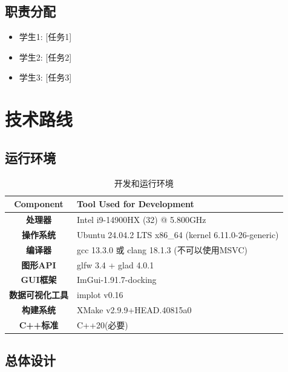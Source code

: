 \documentclass{article}
\begin{document}
\subsection{ 职责分配}
\begin{itemize}[leftmargin=*]
    \item 学生1: [任务1]
    \item 学生2: [任务2]
    \item 学生3: [任务3]
\end{itemize}

\section{技术路线}
\subsection{运行环境}
\begin{table}[H]
    \centering
    \caption{开发和运行环境}
    \begin{tabular}{@{}>{\bfseries}c>{\raggedright\arraybackslash}p{10cm}@{}} %
        \toprule
        \textbf{Component} & \textbf{Tool Used for Development}                    \\
        \midrule
        处理器                & Intel i9-14900HX (32) @ 5.800GHz                      \\
        操作系统               & Ubuntu 24.04.2 LTS x86\_64 (kernel 6.11.0-26-generic) \\
        编译器                & gcc 13.3.0 或 clang 18.1.3 (不可以使用MSVC)                 \\
        图形API              & glfw 3.4 + glad 4.0.1                                 \\
        GUI框架              & ImGui-1.91.7-docking                                  \\
        数据可视化工具            & implot v0.16                                          \\
        构建系统               & XMake v2.9.9+HEAD.40815a0                             \\
        C++标准              & C++20(必要)                                             \\
        \bottomrule
    \end{tabular}
\end{table}
\subsection{总体设计}
\end{document}
